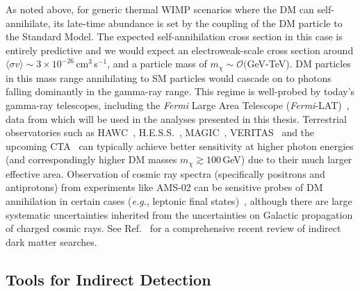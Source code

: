 As noted above, for generic thermal WIMP scenarios where the DM can self-annihilate, its late-time abundance is set by the coupling of the DM particle to the Standard Model. The expected self-annihilation cross section in this case is entirely predictive and we would expect an electroweak-scale cross section around $\langle\sigma v\rangle\sim 3\times10^{-26}$\,cm$^3$\,s$^{-1}$, and a particle mass of $m_\chi\sim\mathcal O($GeV-TeV). DM particles in this mass range annihilating to SM particles would cascade on to photons falling dominantly in the gamma-ray range. This regime is well-probed by today's gamma-ray telescopes, including the \emph{Fermi} Large Area Telescope (\emph{Fermi}-LAT)~\cite{Atwood:2009ez}, data from which will be used in the analyses presented in this thesis. Terrestrial observatories such as HAWC~\cite{Abeysekara:2014ffg}, H.E.S.S.~\cite{Abdallah:2018qtu}, MAGIC~\cite{Ahnen:2017pqx}, VERITAS~\cite{Archambault:2017wyh} and the upcoming CTA~\cite{Doro:2012xx} can typically achieve better sensitivity at higher photon energies (and correspondingly higher DM masses $m_\chi\gtrsim 100$\,GeV) due to their much larger effective area. Observation of cosmic ray spectra (specifically positrons and antiprotons) from experiments like AMS-02 can be sensitive probes of DM annihilation in certain cases (\emph{e.g.}, leptonic final states)~\cite{Aguilar:2014mma,Bergstrom:2013jra}, although there are large systematic uncertainties inherited from the uncertainties on Galactic propagation of charged cosmic rays. See Ref.~\cite{Slatyer:2017sev} for a comprehensive recent review of indirect dark matter searches.   %

\subsection{Tools for Indirect Detection}

